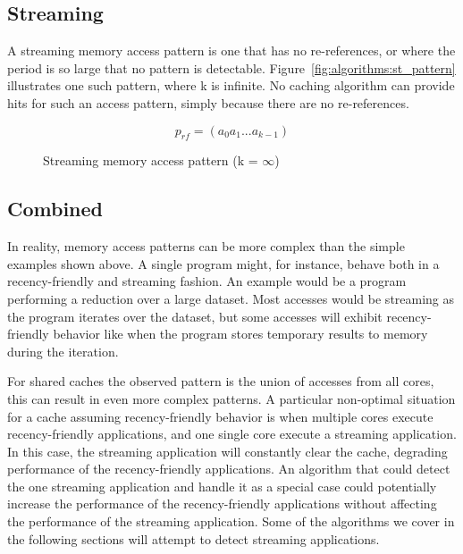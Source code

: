 \subsection{Streaming}
A streaming memory access pattern is one that has no re-references, or where the period is so large that no pattern is detectable.
Figure~\ref{fig:algorithms:st_pattern} illustrates one such pattern, where k is infinite.
No caching algorithm can provide hits for such an access pattern, simply because there are no re-references.

\begin{figure}[ht]
\centering
\begin{equation} \label{fig:algorithms:st_pattern}
p_{rf} = (a_0 a_1 ... a_{k-1})
\end{equation}
\caption{Streaming memory access  pattern (k = $\infty$) }
\end{figure}

\subsection{Combined}
In reality, memory access patterns can be more complex than the simple examples shown above.
A single program might, for instance, behave both in a recency-friendly and streaming fashion. 
An example would be a program performing a reduction over a large dataset.
Most accesses would be streaming as the program iterates over the dataset, but some accesses will exhibit recency-friendly behavior like when the program stores temporary results to memory during the iteration.

For shared caches the observed pattern is the union of accesses from all cores, this can result in even more complex patterns.
A particular non-optimal situation for a cache assuming recency-friendly behavior is when multiple cores execute recency-friendly applications, and one single core execute a streaming application.
In this case, the streaming application will constantly clear the cache, degrading performance of the recency-friendly applications.
An algorithm that could detect the one streaming application and handle it as a special case could potentially increase the performance of the recency-friendly applications without affecting the performance of the streaming application.
Some of the algorithms we cover in the following sections will attempt to detect streaming applications.